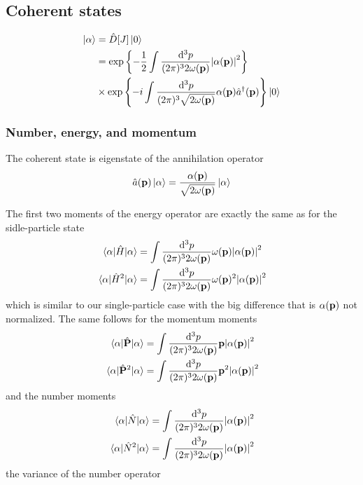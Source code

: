 \subsection{Coherent states}

\begin{equation}
	\begin{split}
		\ket{\alpha}
		&=
		\hat{D}[J]
		\ket{0}
		\\
		&=
		\exp\left\{
			-
			\frac{1}{2}
			\int\frac{\dd[3]{p}}{(2\pi)^32\omega(\vb{p})}
			\abs{\alpha(\vb{p})}^2
		\right\}
		\\
		&\times
		\exp\left\{
			-i
			\int\frac{\dd[3]{p}}{(2\pi)^3\sqrt{2\omega(\vb{p})}}
			\alpha(\vb{p})
			\hat{a}^\dagger(\vb{p})
		\right\}
		\ket{0}
	\end{split}
\end{equation}

\subsubsection{Number, energy, and momentum}

The coherent state is eigenstate of the annihilation operator
\begin{equation}
	\hat{a}(\vb{p})
	\ket{\alpha}
	=
	\frac{\alpha(\vb{p})}{\sqrt{2\omega(\vb{p})}}
	\ket{\alpha}
\end{equation}

The first two moments of the energy operator are exactly the same as for the sidle-particle state
\begin{align}
	\expval{\hat{H}}{\alpha}
	&=
	\int\frac{\dd[3]{p}}{(2\pi)^32\omega(\vb{p})}
	\omega(\vb{p})
	\abs{\alpha(\vb{p})}^2
	\\
	\expval{\hat{H}^2}{\alpha}
	&=
	\int\frac{\dd[3]{p}}{(2\pi)^32\omega(\vb{p})}
	\omega(\vb{p})^2
	\abs{\alpha(\vb{p})}^2
\end{align}
which is similar to our single-particle case with the big difference that is $\alpha(\vb{p})$ not normalized.
The same follows for the momentum moments
\begin{align}
	\expval{\hat{\vb{P}}}{\alpha}
	&=
	\int\frac{\dd[3]{p}}{(2\pi)^32\omega(\vb{p})}
	\vb{p}
	\abs{\alpha(\vb{p})}^2
	\\
	\expval{\hat{\vb{P}}^2}{\alpha}
	&=
	\int\frac{\dd[3]{p}}{(2\pi)^32\omega(\vb{p})}
	\vb{p}^2
	\abs{\alpha(\vb{p})}^2
\end{align}
and the number moments
\begin{align}
	\expval{\hat{N}}{\alpha}
	&=
	\int\frac{\dd[3]{p}}{(2\pi)^32\omega(\vb{p})}
	\abs{\alpha(\vb{p})}^2
	\\
	\expval{\hat{N}^2}{\alpha}
	&=
	\int\frac{\dd[3]{p}}{(2\pi)^32\omega(\vb{p})}
	\abs{\alpha(\vb{p})}^2
\end{align}
the variance of the number operator


